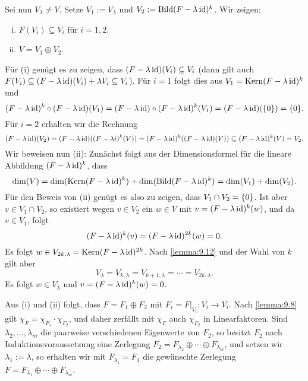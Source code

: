 \begin{beweis}
	Sei nun $V_\lambda \neq V$.
	Setze $V_1 := V_\lambda$ und $V_2 := \operatorname{Bild}(F - \lambda \operatorname{id})^k$.
	Wir zeigen:
	\begin{enumerate}[(i)]
		\item $F(V_i) \subseteq V_i$ für $i = 1,2$.
		\item $V = V_1 \oplus V_2$.
	\end{enumerate}
	Für (i) genügt es zu zeigen, dass $(F - \lambda \operatorname{id})(V_i) \subseteq V_i$ (dann gilt auch $F(V_i) \subseteq (F-\lambda \operatorname{id})(V_i) + \lambda V_i \subseteq V_i$).
	Für $i = 1$ folgt dies aus $V_1 = \operatorname{Kern}(F - \lambda \operatorname{id})^k$ und
	\[
		(F-\lambda \operatorname{id})^k \circ (F-\lambda \operatorname{id})(V_1) = (F - \lambda \operatorname{id}) \circ (F - \lambda \operatorname{id})^k(V_1) = (F - \lambda \operatorname{id})(\{0\}) = \{0\}.
	\]
	Für $i = 2$ erhalten wir die Rechnung
	\[
		(F-\lambda \operatorname{id})(V_2) = (F-\lambda \operatorname{id})((F-\lambda i)^k(V)) = (F - \lambda \operatorname{id})^k((F - \lambda \operatorname{id})(V)) \subseteq (F-\lambda \operatorname{id})^k(V) = V_2.
	\]
	Wir beweisen nun (ii):
	Zunächst folgt aus der Dimensionsformel für die lineare Abbildung $(F-\lambda \operatorname{id})^k$, dass
	\[
		\dim(V) = \dim(\operatorname{Kern}(F - \lambda \operatorname{id})^k) + \dim(\operatorname{Bild}(F - \lambda \operatorname{id})^k) = \dim(V_1) + \dim(V_2).
	\]
	Für den Beweis von (ii) genügt es also zu zeigen, dass $V_1 \cap V_2 = \{0\}$.
	Ist aber $v \in V_1 \cap V_2$, so existiert wegen $v \in V_2$ ein $w \in V$ mit $v = (F-\lambda \operatorname{id})^k(w)$, und da $v \in V_1$, folgt
	\[
		(F- \lambda \operatorname{id})^k(v) = (F - \lambda \operatorname{id})^{2k}(w) = 0.
	\]
	Es folgt $w \in V_{2k,\lambda} = \operatorname{Kern}(F - \lambda \operatorname{id})^{2k}$.
	Nach \autoref{lemma:9.12} und der Wahl von $k$ gilt aber
	\[
		V_\lambda = V_{k,\lambda} = V_{k+1,\lambda} = \cdots = V_{2k,\lambda}.
	\]
	Es folgt $w \in V_{\lambda}$ und $v = (F - \lambda \operatorname{id})^{k}(w) = 0$.
	
	Aus (i) und (ii) folgt, dass $F = F_1 \oplus F_2$ mit $F_i = F\big|_{V_i} \colon V_i \rightarrow V_i$.
	Nach \autoref{lemma:9.8} gilt $\chi_F = \chi_{F_1} \cdot \chi_{F_2}$, und daher zerfällt mit $\chi_F$ auch $\chi_{F_2}$ in Linearfaktoren.
	Sind $\lambda_2,\dots,\lambda_m$ die paarweise verschiedenen Eigenwerte von $F_2$, so besitzt $F_2$ nach Induktionsvoraussetzung eine Zerlegung $F_2 = F_{\lambda_2} \oplus \cdots \oplus F_{\lambda_m}$, und setzen wir $\lambda_1 := \lambda$, so erhalten wir mit $F_{\lambda_1} = F_1$ die gewünschte Zerlegung $F = F_{\lambda_1} \oplus \cdots \oplus F_{\lambda_m}$. \qedhere
\end{beweis}

